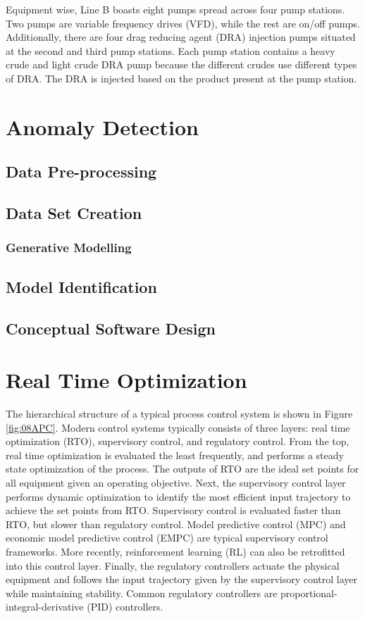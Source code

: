Equipment wise, Line B boasts eight pumps spread across four pump stations. Two pumps are variable frequency drives (VFD), while the rest are on/off pumps. Additionally, there are four drag reducing agent (DRA) injection pumps situated at the second and third pump stations. Each pump station contains a heavy crude and light crude DRA pump because the different crudes use different types of DRA.  The DRA is injected based on the product present at the pump station. 

\section{Anomaly Detection}
\subsection{Data Pre-processing}
\subsection{Data Set Creation}
\subsubsection{Generative Modelling}
\subsection{Model Identification}
\subsection{Conceptual Software Design}

\section{Real Time Optimization}
The hierarchical structure of a typical process control system is shown in Figure \ref{fig:08APC}. Modern control systems typically consists of three layers: real time optimization (RTO), supervisory control, and regulatory control.  From the top, real time optimization is evaluated the least frequently, and performs a steady state optimization of the process.  The outputs of RTO are the ideal set points for all equipment given an operating objective.  Next, the supervisory control layer performs dynamic optimization to identify the most efficient input trajectory to achieve the set points from RTO. Supervisory control is evaluated faster than RTO, but slower than regulatory control. Model predictive control (MPC) and economic model predictive control (EMPC) are typical supervisory control frameworks. More recently, reinforcement learning (RL) can also be retrofitted into this control layer. Finally, the regulatory controllers actuate the physical equipment and follows the input trajectory given by the supervisory control layer while maintaining stability.  Common regulatory controllers are proportional-integral-derivative (PID) controllers.

